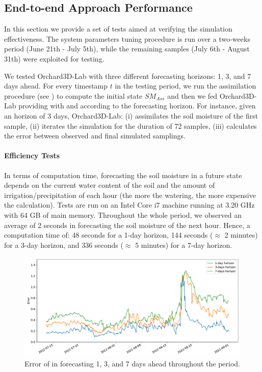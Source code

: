 \subsection{End-to-end Approach Performance}
\label{orchard-ssec:eval_end_to_end}

In this section we provide a set of tests aimed at verifying the simulation effectiveness.
The system parameters tuning procedure is run over a two-weeks period (June 21th - July 5th), while the remaining samples (July 6th - August 31th) were exploited for testing.

We tested Orchard3D-Lab with three different forecasting horizons: 1, 3, and 7 days ahead.
For every timestamp $t$ in the testing period, we run the assimilation procedure (see ) to compute the initial state $SM_{Ass}$ and then we fed Orchard3D-Lab providing with \Wt and \It  according to the forecasting horizon.
For instance, given an horizon of 3 days, Orchard3D-Lab: (i) assimilates the soil moisture of the first sample, (ii) iterates the simulation for the duration of 72 samples, (iii) calculates the error between observed and final simulated samplings.

\paragraph{Efficiency Tests} In terms of computation time, forecasting the soil moisture in a future state depends on the current water content of the soil and the amount of irrigation/precipitation of each hour (the more the watering, the more expensive the calculation).
Tests are run on an Intel Core i7 machine running at 3.20 GHz with 64 GB of main memory.
Throughout the whole period, we observed an average of 2 seconds in forecasting the soil moisture of the next hour.
Hence, a computation time of: 48 seconds for a 1-day horizon, 144 seconds ($\approx$ 2 minutes) for a 3-day horizon, and 336 seconds ($\approx$ 5 minutes) for a 7-day horizon.

\begin{figure}[t]
    \centering
    \includegraphics[scale=.4]{chapters/physics-aware/orchard/img/forecasting_avg_with_forbidden_sensors.pdf}
    \caption{Error of  in forecasting 1, 3, and 7 days ahead throughout the period.}
    \label{orchard-fig:forecasting_avg}
\end{figure}

